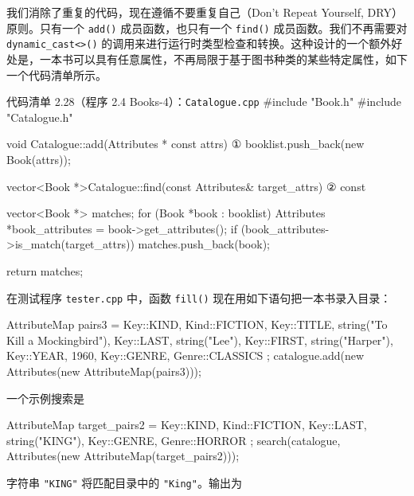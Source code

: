 我们消除了重复的代码，现在遵循不要重复自己（Don't Repeat Yourself, DRY）原则。只有一个 \texttt{add()} 成员函数，也只有一个 \texttt{find()} 成员函数。我们不再需要对 \texttt{dynamic\_\allowbreak{}cast<>(\allowbreak{})\allowbreak{}} 的调用来进行运行时类型检查和转换。这种设计的一个额外好处是，一本书可以具有任意属性，不再局限于基于图书种类的某些特定属性，如下一个代码清单所示。

\begin{codeboxt}{代码清单 2.28（程序 2.4 Books-4）：\texttt{Catalogue.\allowbreak{}cpp}}
#include "Book.h"
#include "Catalogue.h"

void Catalogue::add(Attributes * const attrs)                     ①
{
    booklist.push_back(new Book(attrs));
}

vector<Book *>Catalogue::find(const Attributes& target_attrs)     ②
    const
{
    vector<Book *> matches;
    for (Book *book : booklist)
    {
        Attributes *book_attributes = book->get_attributes();
        if (book_attributes->is_match(target_attrs))
        {
            matches.push_back(book);
        }
    }

    return matches;
}
\end{codeboxt}
\par
{}\par

在测试程序 \texttt{tester.\allowbreak{}cpp} 中，函数 \texttt{fill()} 现在用如下语句把一本书录入目录：

\begin{codebox}
    AttributeMap pairs3 =
    {
        {Key::KIND,  Kind::FICTION},
        {Key::TITLE, string("To Kill a Mockingbird")},
        {Key::LAST,  string("Lee")},
        {Key::FIRST, string("Harper")},
        {Key::YEAR,  1960},
        {Key::GENRE, Genre::CLASSICS}
    };
    catalogue.add(new Attributes(new AttributeMap(pairs3)));
\end{codebox}

一个示例搜索是

\begin{codebox}
    AttributeMap target_pairs2 =
    {
        {Key::KIND,  Kind::FICTION},
        {Key::LAST,  string("KING")},
        {Key::GENRE, Genre::HORROR}
    };
    search(catalogue, Attributes(new AttributeMap(target_pairs2)));
\end{codebox}

字符串 \texttt{"KING"} 将匹配目录中的 \texttt{"King"}。输出为

